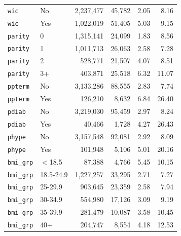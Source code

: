 {\begin{longtable}{llrrrr}
\texttt{wic} & No & 2,237,477 & 45,782 & 2.05 & 8.16 \\
\texttt{wic} & Yes & 1,022,019 & 51,405 & 5.03 & 9.15 \\
\texttt{parity} & 0 & 1,315,141 & 24,099 & 1.83 & 8.56 \\
\texttt{parity} & 1 & 1,011,713 & 26,063 & 2.58 & 7.28 \\
\texttt{parity} & 2 & 528,771 & 21,507 & 4.07 & 8.51 \\
\texttt{parity} & 3+ & 403,871 & 25,518 & 6.32 & 11.07 \\
\texttt{ppterm} & No & 3,133,286 & 88,555 & 2.83 & 7.74 \\
\texttt{ppterm} & Yes & 126,210 & 8,632 & 6.84 & 26.40 \\
\texttt{pdiab} & No & 3,219,030 & 95,459 & 2.97 & 8.24 \\
\texttt{pdiab} & Yes & 40,466 & 1,728 & 4.27 & 26.43 \\
\texttt{phype} & No & 3,157,548 & 92,081 & 2.92 & 8.09 \\
\texttt{phype} & Yes & 101,948 & 5,106 & 5.01 & 20.16 \\
\texttt{bmi\_grp} & $<$18.5 & 87,388 & 4,766 & 5.45 & 10.15 \\
\texttt{bmi\_grp} & 18.5-24.9 & 1,227,257 & 33,295 & 2.71 & 7.27 \\
\texttt{bmi\_grp} & 25-29.9 & 903,645 & 23,359 & 2.58 & 7.94 \\
\texttt{bmi\_grp} & 30-34.9 & 554,980 & 17,126 & 3.09 & 9.19 \\
\texttt{bmi\_grp} & 35-39.9 & 281,479 & 10,087 & 3.58 & 10.45 \\
\texttt{bmi\_grp} & 40+ & 204,747 & 8,554 & 4.18 & 12.53 \\
\bottomrule
\end{longtable}
}
